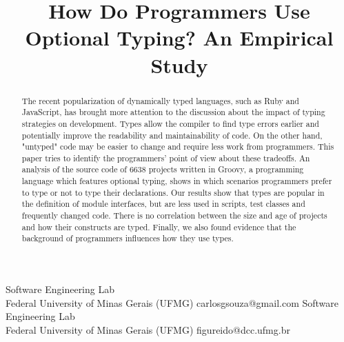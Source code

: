 \documentclass[]{sigplanconf}
\begin{document}
\setlength{\pdfpageheight}{\paperheight}
\setlength{\pdfpagewidth}{\paperwidth}






\title{How Do Programmers Use Optional Typing? An Empirical Study}

           {Software Engineering Lab\\Federal University of Minas Gerais (UFMG)}
           {carlosgsouza@gmail.com}
           {Software Engineering Lab\\Federal University of Minas Gerais (UFMG)}
           {figureido@dcc.ufmg.br}

\maketitle

\begin{abstract}
The recent popularization of dynamically typed languages, such as Ruby and JavaScript, has brought more attention to the discussion about the impact of typing strategies on development.
Types allow the compiler to find type errors earlier and potentially improve the readability and maintainability of code.
On the other hand, "untyped" code may be easier to change and require less work from programmers.
This paper tries to identify the programmers' point of view about these tradeoffs.
An analysis of the source code of 6638 projects written in Groovy, a programming language which features optional typing, shows in which scenarios programmers prefer to type or not to type their declarations. 
Our results show that types are popular in the definition of module interfaces, but are less used in scripts, test classes and frequently changed code.
There is no correlation between the size and age of projects and how their constructs are typed.
Finally, we also found evidence that the background of programmers influences how they use types.
\end{abstract}
\end{document}
